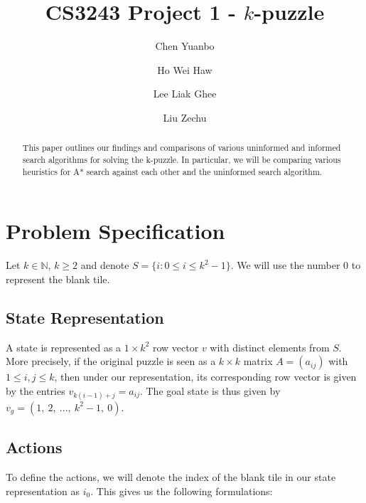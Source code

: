 \documentclass[runningheads]{llncs}
\begin{document}
%
\title{CS3243 Project 1 - $k$-puzzle}
%
%
\author{Chen Yuanbo \and
Ho Wei Haw \and
Lee Liak Ghee \and
Liu Zechu}
%
%
%
\maketitle              %
%
\begin{abstract}
This paper outlines our findings and comparisons of various uninformed and informed search algorithms for solving the k-puzzle. In particular, we will be comparing various heuristics for A* search against each other and the uninformed search algorithm. 

\end{abstract}
%
%
%
\section{Problem Specification}
Let $k \in \mathbb{N}$, $k \geq 2$ and denote $ S = \{ i : 0 \leq i \leq k^2 - 1 \}$. We will use the number $0$ to represent the blank tile.

\subsection{State Representation}
A state is represented as a $1 \times k^{2}$ row vector $v$ with distinct elements from $S$. More precisely, if the original puzzle is seen as a $k \times k$ matrix $A = \left( a_{ij} \right)$ with $1 \leq i,j \leq k$, then under our representation, its corresponding row vector is given by the entries $ v_{k(i - 1) + j} = a_{ij} $. The goal state is thus given by $v_g = \left( 1, \ 2,\ ..., \ k^2 - 1, \ 0 \right)$.

\subsection{Actions}
To define the actions, we will denote the index of the blank tile in our state representation as $i_0$. This gives us the following formulations:
\end{document}
